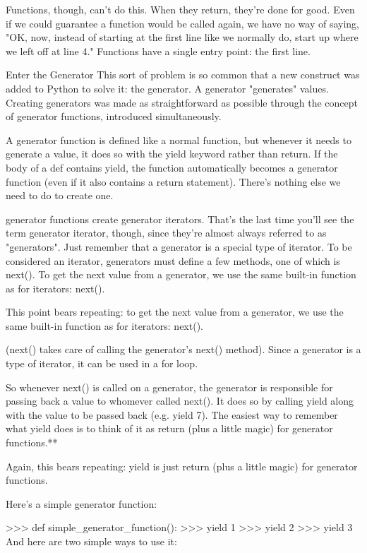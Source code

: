 Functions, though, can't do this. When they return, they're done for good. Even if we could guarantee a function would be called again, we have no way of saying, "OK, now, instead of starting at the first line like we normally do, start up where we left off at line 4." Functions have a single entry point: the first line.

Enter the Generator
This sort of problem is so common that a new construct was added to Python to solve it: the generator. A generator "generates" values. Creating generators was made as straightforward as possible through the concept of generator functions, introduced simultaneously.

A generator function is defined like a normal function, but whenever it needs to generate a value, it does so with the yield keyword rather than return. If the body of a def contains yield, the function automatically becomes a generator function (even if it also contains a return statement). There's nothing else we need to do to create one.

generator functions create generator iterators. That's the last time you'll see the term generator iterator, though, since they're almost always referred to as "generators". Just remember that a generator is a special type of iterator. To be considered an iterator, generators must define a few methods, one of which is next(). To get the next value from a generator, we use the same built-in function as for iterators: next().

This point bears repeating: to get the next value from a generator, we use the same built-in function as for iterators: next().

(next() takes care of calling the generator's next() method). Since a generator is a type of iterator, it can be used in a for loop.

So whenever next() is called on a generator, the generator is responsible for passing back a value to whomever called next(). It does so by calling yield along with the value to be passed back (e.g. yield 7). The easiest way to remember what yield does is to think of it as return (plus a little magic) for generator functions.**

Again, this bears repeating: yield is just return (plus a little magic) for generator functions.

Here's a simple generator function:

>>> def simple_generator_function():
>>>    yield 1
>>>    yield 2
>>>    yield 3
And here are two simple ways to use it:


